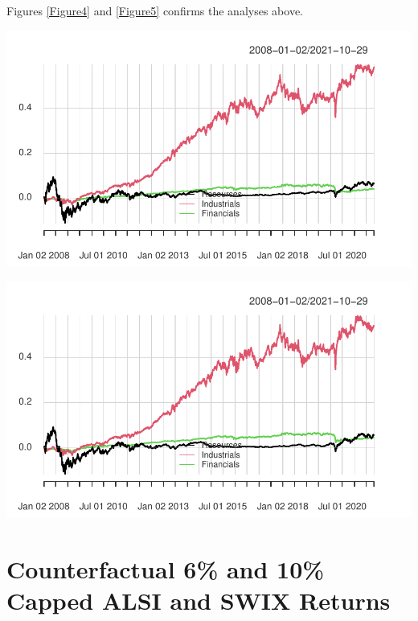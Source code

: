 \documentclass[11pt,preprint, authoryear]{elsarticle}
\let\origfigure\figure
\let\endorigfigure\endfigure
\renewenvironment{figure}[1][2] {
    \expandafter\origfigure\expandafter[H]
} {
    \endorigfigure
}
\numberwithin{equation}{section}
\numberwithin{figure}{section}
\numberwithin{table}{section}
\begin{document}
Figures \ref{Figure4} and \ref{Figure5} confirms the analyses above.

\begin{figure}[H]

{\centering \includegraphics{Question3_files/figure-latex/ALSI contr plot-1} 

}

\caption{Dynamic Weighted Return Contribution to SWIX Portfolio Per Sector. \label{Figure4}}\label{fig:ALSI contr plot}
\end{figure}

\begin{figure}[H]

{\centering \includegraphics{Question3_files/figure-latex/SWIX contr plot-1} 

}

\caption{Dynamic Weighted Return Contribution to SWIX Portfolio Per Sector. \label{Figure5}}\label{fig:SWIX contr plot}
\end{figure}

\hypertarget{counterfactual-6-and-10-capped-alsi-and-swix-returns}{%
\section{Counterfactual 6\% and 10\% Capped ALSI and SWIX
Returns}\label{counterfactual-6-and-10-capped-alsi-and-swix-returns}}
\end{document}
